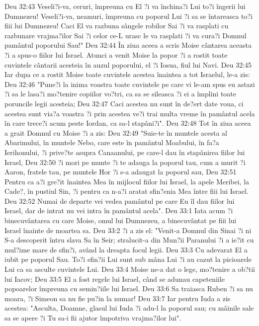 Deu 32:43  Veseli?i-va, ceruri, împreuna cu El ?i va închina?i Lui to?i îngerii lui Dumnezeu! Veseli?i-va, neamuri, împreuna cu poporul Lui ?i sa se întareasca to?i fiii lui Dumnezeu! Caci El va razbuna sângele robilor Sai ?i va rasplati cu razbunare vrajma?ilor Sai ?i celor ce-L urasc le va rasplati ?i va cura?i Domnul pamântul poporului Sau!"
Deu 32:44  În ziua aceea a scris Moise cântarea aceasta ?i a spus-o fiilor lui Israel. Atunci a venit Moise la popor ?i a rostit toate cuvintele cântarii acesteia în auzul poporului, el ?i Iosua, fiul lui Navi.
Deu 32:45  Iar dupa ce a rostit Moise toate cuvintele acestea înaintea a tot Israelul, le-a zis:
Deu 32:46  "Pune?i la inima voastra toate cuvintele pe care vi le-am spus eu astazi ?i sa le lasa?i mo?tenire copiilor vo?tri, ca sa se sileasca ?i ei a împlini toate poruncile legii acesteia;
Deu 32:47  Caci acestea nu sunt în de?ert date voua, ci acestea sunt via?a voastra ?i prin acestea ve?i trai multa vreme în pamântul acela în care trece?i acum peste Iordan, ca sa-l stapâni?i".
Deu 32:48  Tot în ziua aceea a grait Domnul cu Moise ?i a zis:
Deu 32:49  "Suie-te în muntele acesta al Abarimului, în muntele Nebo, care este în pamântul Moabului, în fa?a Ierihonului, ?i prive?te asupra Canaanului, pe care-l dau în stapânirea fiilor lui Israel,
Deu 32:50  ?i mori pe munte ?i te adauga la poporul tau, cum a murit ?i Aaron, fratele tau, pe muntele Hor ?i s-a adaugat la poporul sau,
Deu 32:51  Pentru ca a?i gre?it înaintea Mea în mijlocul fiilor lui Israel, la apele Meribei, la Cade?, în pustiul Sin, ?i pentru ca n-a?i aratat sfin?enia Mea între fiii lui Israel.
Deu 32:52  Numai de departe vei vedea pamântul pe care Eu îl dau fiilor lui Israel, dar de intrat nu vei intra în pamântul acela".
Deu 33:1  Iata acum ?i binecuvântarea cu care Moise, omul lui Dumnezeu, a binecuvântat pe fiii lui Israel înainte de moartea sa.
Deu 33:2  ?i a zis el: "Venit-a Domnul din Sinai ?i ni S-a descoperit întru slava Sa în Seir; stralucit-a din Mun?ii Paranului ?i a ie?it cu mul?ime mare de sfin?i, având la dreapta focul legii.
Deu 33:3  Cu adevarat El a iubit pe poporul Sau. To?i sfin?ii Lui sunt sub mâna Lui ?i au cazut la picioarele Lui ca sa asculte cuvintele Lui.
Deu 33:4  Moise ne-a dat o lege, mo?tenire a ob?tii lui Iacov;
Deu 33:5  El a fost regele lui Israel, când se adunau capeteniile popoarelor împreuna cu semin?iile lui Israel.
Deu 33:6  Sa traiasca Ruben ?i sa nu moara, ?i Simeon sa nu fie pu?in la numar!
Deu 33:7  Iar pentru Iuda a zis acestea: "Asculta, Doamne, glasul lui Iuda ?i adu-l la poporul sau; cu mâinile sale sa se apere ?i Tu sa-i fii ajutor împotriva vrajma?ilor lui".

